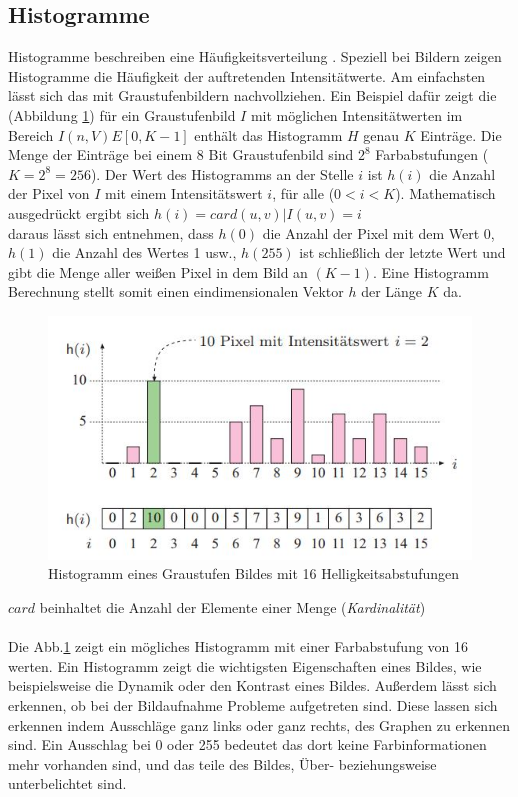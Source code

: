 \subsection{Histogramme}\label{s.histogramme}
Histogramme beschreiben eine Häufigkeitsverteilung \cite[42ff.]{burger2009digitale}. Speziell bei Bildern zeigen Histogramme die Häufigkeit der auftretenden Intensitätwerte. Am einfachsten lässt sich das mit Graustufenbildern nachvollziehen. Ein Beispiel dafür zeigt die (Abbildung \ref{img:histogramm}) für ein Graustufenbild $I$ mit möglichen Intensitätwerten im Bereich $I(n,V)E[0,K-1]$ enthält das Histogramm $H$ genau $K$ Einträge. Die Menge der Einträge bei einem 8 Bit Graustufenbild sind $2^8$ Farbabstufungen ($K=2^8=256$). Der Wert des Histogramms an der Stelle $i$ ist $h(i)$ die Anzahl der Pixel von $I$ mit einem Intensitätswert $i$, für alle ($0<i<K$). Mathematisch ausgedrückt ergibt sich $h(i)=card{(u,v) | I(u,v)=i}$\\
  daraus lässt sich entnehmen, dass $h(0)$ die Anzahl der Pixel mit dem Wert 0, $h(1)$ die Anzahl des Wertes 1 usw., $h(255)$ ist schließlich der letzte Wert und gibt die Menge aller weißen Pixel in dem Bild an $(K-1)$. Eine Histogramm Berechnung stellt somit einen eindimensionalen Vektor $h$ der Länge $K$ da.\\
  \begin{figure}
    [h]
    \centering
    \includegraphics[scale=1.0]{Sources/histogramm.jpg}
    \caption{Histogramm eines Graustufen Bildes mit 16 Helligkeitsabstufungen \cite[42]{burger2009digitale}}
    \label{img:histogramm}
  \end{figure}
$card$ beinhaltet die Anzahl der Elemente einer Menge (\textit{Kardinalität})\\\\
Die Abb.\ref{img:histogramm} zeigt ein mögliches Histogramm mit einer Farbabstufung von 16 werten. Ein Histogramm zeigt die wichtigsten Eigenschaften eines Bildes, wie beispielsweise die Dynamik oder den Kontrast eines Bildes. Außerdem lässt sich erkennen, ob bei der Bildaufnahme Probleme aufgetreten sind. Diese lassen sich erkennen indem Ausschläge ganz links oder ganz rechts, des Graphen zu erkennen sind. Ein Ausschlag bei 0 oder 255 bedeutet das dort keine Farbinformationen mehr vorhanden sind, und das teile des Bildes, Über- beziehungsweise unterbelichtet sind.\\\\
